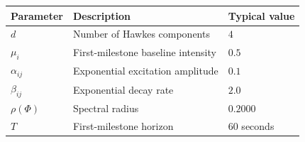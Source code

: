 \begin{tabular}{lll}
  \hline
  Parameter & Description & Typical value \\
  \hline
  $d$ & Number of Hawkes components & $4$ \\
  $\mu_i$ & First-milestone baseline intensity & $0.5$ \\
  $\alpha_{ij}$ & Exponential excitation amplitude & $0.1$ \\
  $\beta_{ij}$ & Exponential decay rate & $2.0$ \\
  $\rho(\Phi)$ & Spectral radius & $0.2000$ \\
  $T$ & First-milestone horizon & $60$ seconds \\
  \hline
\end{tabular}
